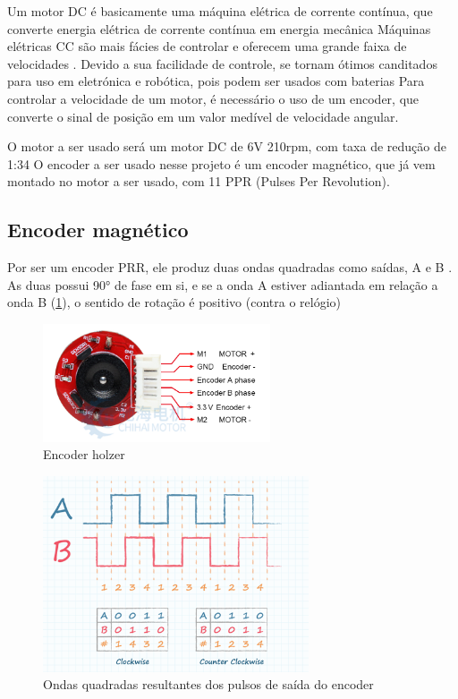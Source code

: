 
Um motor DC é basicamente uma máquina elétrica de corrente contínua, que converte energia elétrica de corrente contínua em energia mecânica
Máquinas elétricas CC são mais fácies de controlar e oferecem uma grande faixa de velocidades \cite{Maquinas_eletricas}.
Devido a sua facilidade de controle, se tornam ótimos canditados para uso em eletrónica e robótica, pois podem ser usados com baterias
Para controlar a velocidade de um motor, é necessário o uso de um encoder, que converte o sinal de posição em um valor medível de velocidade angular.


O motor a ser usado será um motor DC de 6V 210rpm, com taxa de redução de 1:34
O encoder a ser usado nesse projeto é um encoder magnético, que já vem montado no motor a ser usado, com 11 PPR (Pulses Per Revolution).

\subsection{Encoder magnético}

Por ser um encoder PRR, ele produz duas ondas quadradas como saídas, A e B \cite{encoder_ppr}.
As duas possui 90° de fase em si, e se a onda A estiver adiantada em relação a onda B (\ref{encoder_ppr_ab}), o sentido de rotação é positivo (contra o relógio)

\begin{figure}[h]
	\centering
	\includegraphics[width=0.6\textwidth]{figures/encoder_holzer}
	\caption{Encoder holzer \cite{encoder_holzer}}
\end{figure}

\begin{figure}[h]
	\centering
	\includegraphics[width=0.7\textwidth]{figures/encoder_pulso_ab}
	\caption{Ondas quadradas resultantes dos pulsos de saída do encoder \cite{encoder_ppr}}
	\label{encoder_ppr_ab}
\end{figure}



